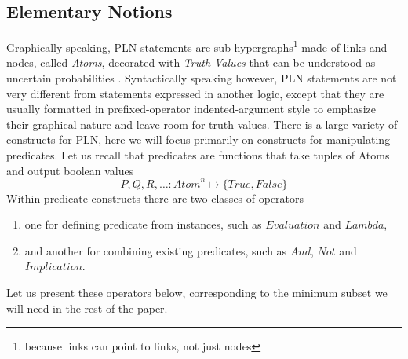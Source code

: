 \documentclass[runningheads]{llncs}
\newcommand{\TTrue}{\textit{True}}
\newcommand{\TFalse}{\textit{False}}
\newcommand{\TAtom}{\textit{Atom}}
\newcommand{\TEval}{\textit{Evaluation}}
\newcommand{\TLamb}{\textit{Lambda}}
\newcommand{\TAnd}{\textit{And}}
\newcommand{\TNot}{\textit{Not}}
\newcommand{\TImpl}{\textit{Implication}}
\begin{document}
\subsection{Elementary Notions}


Graphically speaking, PLN statements are
sub-hypergraphs\footnote{because links can point to links, not just
nodes} made of links and nodes, called \emph{Atoms}, decorated with
\emph{Truth Values} that can be understood as uncertain probabilities
\cite{TODO}.  Syntactically speaking however, PLN statements are not
very different from statements expressed in another logic, except that
they are usually formatted in prefixed-operator indented-argument
style to emphasize their graphical nature and leave room for truth
values.  There is a large variety of constructs for PLN, here we will
focus primarily on constructs for manipulating predicates.  Let us
recall that predicates are functions that take tuples of Atoms and
output boolean values
$$P, Q, R, \hdots: \TAtom^n \mapsto \{\TTrue, \TFalse\}$$ Within
predicate constructs there are two classes of operators
\begin{enumerate}
\item one for defining predicate from instances, such as $\TEval$ and
  $\TLamb$,
\item and another for combining existing predicates, such as $\TAnd$,
  $\TNot$ and $\TImpl$.
\end{enumerate}
Let us present these operators below, corresponding to the minimum
subset we will need in the rest of the paper.
\end{document}
